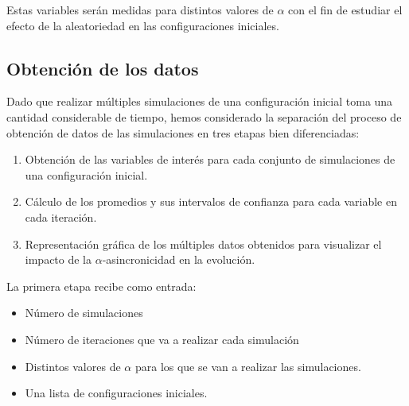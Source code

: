 \documentclass[../proyecto.tex]{memoir}
\begin{document}
Estas variables serán medidas para distintos valores de $\alpha$ con el fin de estudiar el efecto de la aleatoriedad en las configuraciones iniciales. 







\subsection{Obtención de los datos}

Dado que realizar múltiples simulaciones de una configuración inicial toma una cantidad considerable de tiempo, hemos considerado la separación del proceso de obtención de datos de las simulaciones en tres etapas bien diferenciadas:
\begin{enumerate}
\item Obtención de las variables de interés para cada conjunto de simulaciones de una configuración inicial.
\item Cálculo de los promedios y sus intervalos de confianza para cada variable en cada iteración.
\item Representación gráfica de los múltiples datos obtenidos para visualizar el impacto de la $\alpha$-asincronicidad en la evolución.
\end{enumerate}

La primera etapa recibe como entrada: \begin{itemize}
\item Número de simulaciones
\item Número de iteraciones que va a realizar cada simulación
\item Distintos valores de $\alpha$ para los que se van a realizar las simulaciones.
\item Una lista de configuraciones iniciales.
\end{itemize}
\end{document}
